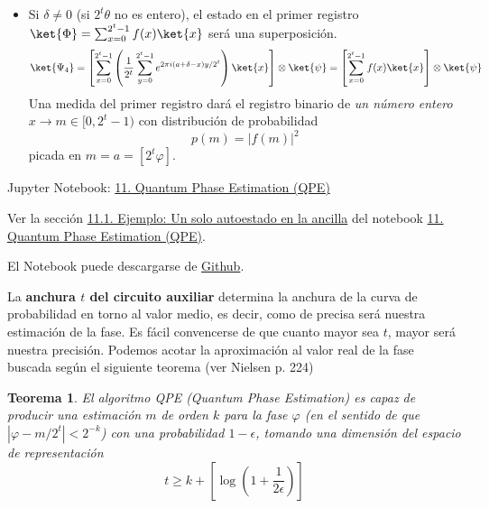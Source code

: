 \documentclass[a4paper,11pt]{book} %
\newtheorem{teorema_contador}{Teorema}
\newcommand{\Teorema}[1]{
		\begin{mybox_gray2}{}
			\begin{teorema_contador}
				 #1 
			\end{teorema_contador} 
		\end{mybox_gray2}
	}
\numberwithin{equation}{chapter}
\def\lc{\left[}
\def\rc{\right]}
\begin{document}
\begin{itemize}
\begin{itemize}
		\item Si $\delta \neq 0$ (si $2^t \theta$ no es entero), el estado en el primer registro  $\ket{\Phi} = \sum_{x=0}^{2^t-1} f(x) \ket{x}$ será una superposición.
			\begin{equation}
			\ket{\Psi_4} = \lc \sum_{x=0}^{2^t-1} \left( \frac{1}{2^{t}}\sum_{y=0}^{2^t-1}  e^{2\pi i (a + \delta  -x) y/2^t} \right) \ket{x} \rc \otimes \ket{\psi} = \lc \sum_{x=0}^{2^t-1} f(x) \ket{x} \rc \otimes \ket{\psi}
			\end{equation}
		Una medida del primer registro dará el registro binario de \textit{un número entero} $x \to m \in [0,2^t-1)$ con distribución de probabilidad 
			\begin{equation} \label{ec_QPE_p(m)}
			p(m) = |f(m)|^2
			\end{equation}		
		picada en $m=a=[2^t\varphi]$. 
	\end{itemize}

\end{itemize}

	\begin{mybox_orange}{Jupyter Notebook: \href{https://www.scbi.uma.es/web/wp-content/uploads/Jupyterbook/CICC_UMA/Notebooks/html/docs/Part_01/Chapter_11-QPE_myst.html}{11. Quantum Phase Estimation (QPE)}}

	Ver la sección \href{https://www.scbi.uma.es/web/wp-content/uploads/Jupyterbook/CICC_UMA/Notebooks/html/docs/Part_01/Chapter_11-QPE_myst.html#sec-notebooks-qpe-1}{11.1. Ejemplo: Un solo autoestado en la ancilla} del notebook \href{https://www.scbi.uma.es/web/wp-content/uploads/Jupyterbook/CICC_UMA/Notebooks/html/docs/Part_01/Chapter_11-QPE_myst.html}{11. Quantum Phase Estimation (QPE)}.
	
	El Notebook puede descargarse de \href{https://github.com/davidcb98/CICC_UMA/blob/master/Notebooks/Part_01/Chapter_11-QPE.ipynb}{Github}.	
	\end{mybox_orange}


La \textbf{anchura $t$ del circuito auxiliar} determina la anchura de la curva de probabilidad en torno al valor medio, es decir, como de precisa será nuestra estimación de la fase. Es fácil convencerse de que cuanto mayor sea $t$, mayor será nuestra precisión. Podemos acotar la aproximación al valor real de la fase buscada según el siguiente teorema  (ver Nielsen \cite{bib_nielsen} p. 224)

	\Teorema{
	El algoritmo QPE (Quantum Phase Estimation) es capaz de producir una \textit{estimación $m$ de orden $k$}  para la fase $\varphi$ (en el sentido de que  $|\varphi- m/2^t |<2^{-k}$) con una  probabilidad $1-\epsilon$,  tomando una dimensión del espacio de representación
	\begin{equation}
	t \geq k  + \left[ \log\left(1 + \frac{1}{2\epsilon}\right) \right] 
	\end{equation}
	}
\end{document}
